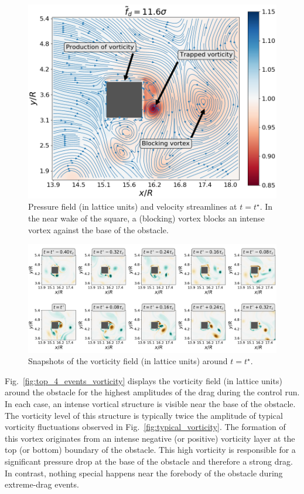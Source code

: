 \documentclass{jfm}
\begin{document}
\begin{figure}
	\centering
	\includegraphics[width=.5\linewidth]{illustr_density_streamlines/illustr_density_streamlines.png}
	\caption{\label{fig:density+streamlines} Pressure field (in lattice units) and velocity streamlines at $t=t^{\star}$. In the near wake of the square, a (blocking) vortex blocks an intense vortex against the base of the obstacle.}
\end{figure}

\begin{figure}
	\centering
	\includegraphics[width=.8\linewidth]{dynamics_extremes/dynamics_extremes.png}
	\caption{\label{fig:vorticity_dynamics} Snapshots of the vorticity field (in lattice units)  around $t=t^{\star}$.}
\end{figure}
%
Fig.~\ref{fig:top_4_events_vorticity} displays the vorticity field (in lattice units) around the obstacle for the highest amplitudes of the drag during the control run.
%
In each case, an intense vortical structure is visible near the base of the obstacle.
The vorticity level of this structure is typically twice the amplitude of typical vorticity fluctuations observed in Fig.~\ref{fig:typical_vorticity}.
The formation of this vortex originates from an intense negative (or positive) vorticity layer at the top (or bottom) boundary of the obstacle. 
%
This high vorticity is responsible for a significant pressure drop at the base of the obstacle and therefore a strong drag.
In contrast, nothing special happens near the forebody of the obstacle during extreme-drag events.  
\end{document}
